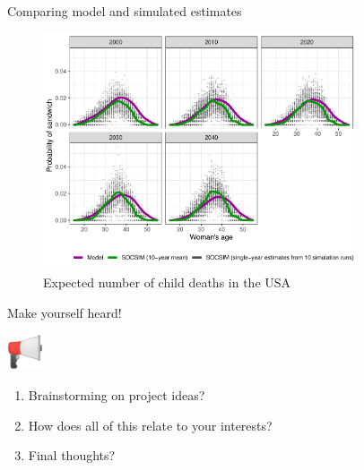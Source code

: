 \documentclass[
  ignorenonframetext,
]{beamer}
\providecommand{\tightlist}{%
  \setlength{\itemsep}{0pt}\setlength{\parskip}{0pt}}
\begin{document}
\begin{frame}{Comparing model and simulated estimates}
\protect\hypertarget{comparing-model-and-simulated-estimates}{}

\begin{figure}
\centering
\includegraphics[width=3.64583in,height=\textheight]{resources/sandwich_comparative_USA}
\caption{Expected number of child deaths in the USA}
\end{figure}

\end{frame}

\begin{frame}{Make yourself heard!}
\protect\hypertarget{make-yourself-heard}{}

\includegraphics[width=0.41667in,height=\textheight]{resources/loud.png}

\begin{enumerate}
\tightlist
\item
  Brainstorming on project ideas?
\item
  How does all of this relate to your interests?
\item
  Final thoughts?
\end{enumerate}

\end{frame}
\end{document}
